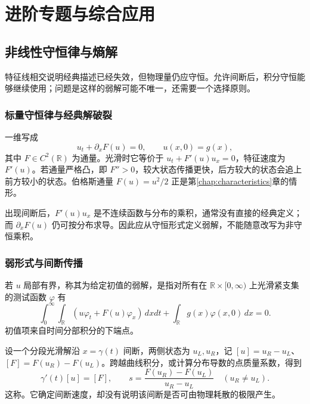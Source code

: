 \documentclass[UTF8,12pt,a4paper,fontset=fandol]{ctexbook}
\begin{document}
\part{进阶专题与综合应用}

\chapter{非线性守恒律与熵解}
\label{chap:conservation}

特征线相交说明经典描述已经失效，但物理量仍应守恒。允许间断后，积分守恒能够继续使用；问题是这样的弱解可能不唯一，还需要一个选择原则。

\section{标量守恒律与经典解破裂}
一维写成
\begin{equation}
 u_t+\partial_xF(u)=0,\qquad u(x,0)=g(x),
 \label{eq:scalar-conservation}
\end{equation}
其中 $F\in C^2(\mathbb R)$ 为通量。光滑时它等价于 $u_t+F'(u)u_x=0$，特征速度为 $F'(u)$。若通量严格凸，即 $F''>0$，较大状态传播更快，后方较大的状态会追上前方较小的状态。伯格斯通量 $F(u)=u^2/2$ 正是第\ref{chap:characteristics}章的情形。

出现间断后，$F'(u)u_x$ 是不连续函数与分布的乘积，通常没有直接的经典定义；而 $\partial_xF(u)$ 仍可按分布求导。因此应从守恒形式定义弱解，不能随意改写为非守恒乘积。

\section{弱形式与间断传播}
若 $u$ 局部有界，称其为给定初值的弱解，是指对所有在 $\mathbb R\times[0,\infty)$ 上光滑紧支集的测试函数 $\varphi$ 有
\begin{equation}
 \int_0^\infty\int_{\mathbb R}(u\varphi_t+F(u)\varphi_x)\,dxdt
 +\int_{\mathbb R}g(x)\varphi(x,0)\,dx=0.
 \label{eq:conservation-weak}
\end{equation}
初值项来自时间分部积分的下端点。

设一个分段光滑解沿 $x=\gamma(t)$ 间断，两侧状态为 $u_L,u_R$，记 $[u]=u_R-u_L$、$[F]=F(u_R)-F(u_L)$。跨越曲线积分，或计算分布导数的点质量系数，得到
\begin{equation}
 \gamma'(t)[u]=[F],\qquad
 s=\frac{F(u_R)-F(u_L)}{u_R-u_L}\quad(u_R\ne u_L).
 \label{eq:rankine-hugoniot}
\end{equation}
这称。它确定间断速度，却没有说明该间断是否可由物理耗散的极限产生。
\end{document}
